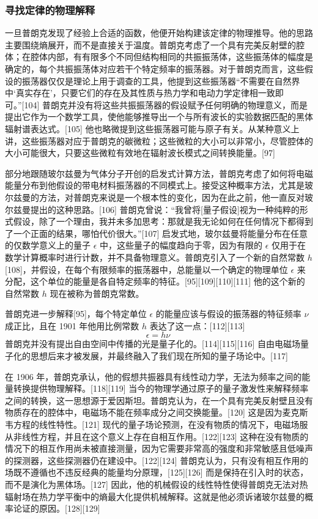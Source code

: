 \subsubsection{寻找定律的物理解释}
一旦普朗克发现了经验上合适的函数，他便开始构建该定律的物理推导。他的思路主要围绕熵展开，而不是直接关于温度。普朗克考虑了一个具有完美反射壁的腔体；在腔体内部，有有限多个不同但结构相同的共振振荡体，这些振荡体的幅度是确定的，每个共振振荡体对应若干个特定频率的振荡器。对于普朗克而言，这些假设的振荡器仅仅是理论上用于调查的工具，他提到这些振荡器“不需要在自然界中‘真实存在’，只要它们的存在及其性质与热力学和电动力学定律相一致即可。”[104] 普朗克并没有将这些共振振荡器的假设赋予任何明确的物理意义，而是提出它作为一个数学工具，使他能够推导出一个与所有波长的实验数据匹配的黑体辐射谱表达式。[105] 他也略微提到这些振荡器可能与原子有关。从某种意义上讲，这些振荡器对应于普朗克的碳微粒；这些微粒的大小可以非常小，尽管腔体的大小可能很大，只要这些微粒有效地在辐射波长模式之间转换能量。[97]

部分地跟随玻尔兹曼为气体分子开创的启发式计算方法，普朗克考虑了如何将电磁能量分布到他假设的带电材料振荡器的不同模式上。接受这种概率方法，尤其是玻尔兹曼的方法，对普朗克来说是一个根本性的变化，因为在此之前，他一直反对玻尔兹曼提出的这种思路。[106] 普朗克曾说：“我曾将[量子假设]视为一种纯粹的形式假设，除了一个理由，我并未多加思考：那就是我无论如何在任何情况下都得到了一个正面的结果，哪怕代价很大。”[107] 启发式地，玻尔兹曼将能量分布在任意的仅数学意义上的量子 \( \epsilon \) 中，这些量子的幅度趋向于零，因为有限的 \( \epsilon \) 仅用于在数学计算概率时进行计数，并不具备物理意义。普朗克引入了一个新的自然常数 \( h \)[108]，并假设，在每个有限频率的振荡器中，总能量以一个确定的物理单位 \( \epsilon \) 来分配，这个单位的能量是各自特定频率的特征。[95][109][110][111] 他的这个新的自然常数 \( h \) 现在被称为普朗克常数。

普朗克进一步解释[95]，每个特定单位 \( \epsilon \) 的能量应该与假设的振荡器的特征频率 \( \nu \) 成正比，且在 1901 年他用比例常数 \( h \) 表达了这一点：[112][113]
\[
\epsilon = h\nu~
\]
普朗克并没有提出自由空间中传播的光是量子化的。[114][115][116] 自由电磁场量子化的思想后来才被发展，并最终融入了我们现在所知的量子场论中。[117]

在 1906 年，普朗克承认，他的假想共振器具有线性动力学，无法为频率之间的能量转换提供物理解释。[118][119] 当今的物理学通过原子的量子激发性来解释频率之间的转换，这一思想源于爱因斯坦。普朗克认为，在一个具有完美反射壁且没有物质存在的腔体中，电磁场不能在频率成分之间交换能量。[120] 这是因为麦克斯韦方程的线性特性。[121] 现代的量子场论预测，在没有物质的情况下，电磁场服从非线性方程，并且在这个意义上存在自相互作用。[122][123] 这种在没有物质的情况下的相互作用尚未被直接测量，因为它需要非常高的强度和非常敏感且低噪声的探测器，这些探测器仍在建设中。[122][124] 普朗克认为，只有没有相互作用的场既不遵循也不违反经典的能量均分原理，[125][126] 而是保持在引入时的状态，而不是演化为黑体场。[127] 因此，他的机械假设的线性特性使得普朗克无法对热辐射场在热力学平衡中的熵最大化提供机械解释。这就是他必须诉诸玻尔兹曼的概率论证的原因。[128][129]

